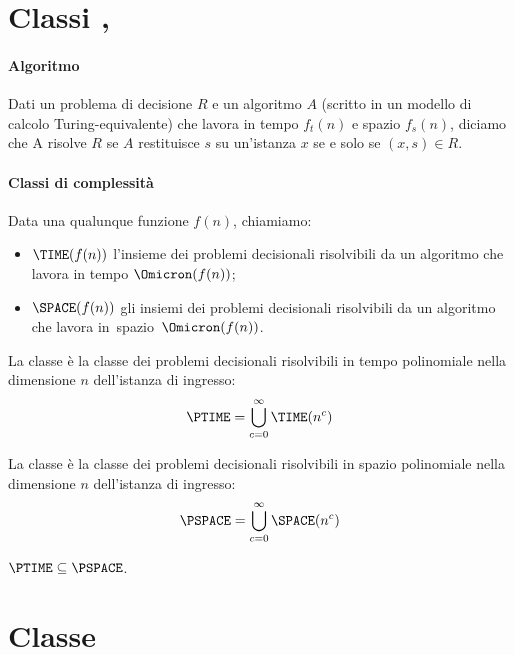 \section{Classi \PTIME, \PSPACE}

\paragraph{Algoritmo}
Dati un problema di decisione \(R\) e un algoritmo \(A\) (scritto in un modello di calcolo Turing-equivalente) che lavora in tempo \(f_t(n)\) e spazio \(f_s(n)\), diciamo che A risolve \(R\) se \(A\) restituisce \(s\) su un'istanza \(x\) se e solo se \((x,s) \in R\).

\paragraph{Classi di complessità}
Data una qualunque funzione \(f(n)\), chiamiamo:
\begin{itemize}
    \item \(\TIME(f(n))\) l'insieme dei problemi decisionali risolvibili da un algoritmo che lavora in tempo \(\Omicron(f(n))\);
    \item \(\SPACE(f(n))\) gli insiemi dei problemi decisionali risolvibili da un algoritmo che lavora \mbox{in spazio \(\Omicron(f(n))\)}.
\end{itemize}

La classe {\PTIME} è la classe dei problemi decisionali risolvibili in tempo polinomiale nella dimensione \(n\) dell'istanza di ingresso:
\[
    \PTIME = \bigcup_{c=0}^{\infty} \TIME(n^c)
\]

La classe {\PSPACE} è la classe dei problemi decisionali risolvibili in spazio polinomiale nella dimensione \(n\) dell'istanza di ingresso:
\[
    \PSPACE = \bigcup_{c=0}^{\infty} \SPACE(n^c)
\]

\begin{note}
\(\PTIME \subseteq \PSPACE\).
\end{note}

\section{Classe \NP}

